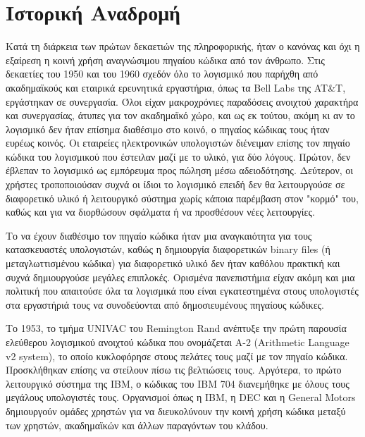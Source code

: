 \documentclass{article}
\begin{document}
{\section{Ιστορική Αναδρομή}
Κατά τη διάρκεια των πρώτων δεκαετιών της πληροφορικής, ήταν ο κανόνας και όχι η εξαίρεση η κοινή χρήση αναγνώσιμου πηγαίου κώδικα από τον άνθρωπο. Στις δεκαετίες του 1950 και του 1960 σχεδόν όλο το λογισμικό που παρήχθη από ακαδημαϊκούς και εταιρικά ερευνητικά εργαστήρια, όπως τα \textlatin{Bell Labs} της  \textlatin{AT&T}, εργάστηκαν σε συνεργασία. Όλοι είχαν μακροχρόνιες παραδόσεις ανοιχτού χαρακτήρα και συνεργασίας, άτυπες για τον ακαδημαϊκό χώρο, και ως εκ τούτου, ακόμη κι αν το λογισμικό δεν ήταν επίσημα διαθέσιμο στο κοινό, ο πηγαίος κώδικας τους ήταν ευρέως κοινός. Οι εταιρείες ηλεκτρονικών υπολογιστών διένειμαν επίσης τον πηγαίο κώδικα του λογισμικού που έστειλαν μαζί με το υλικό, για δύο λόγους. Πρώτον, δεν έβλεπαν το λογισμικό ως εμπόρευμα προς πώληση μέσω αδειοδότησης. Δεύτερον, οι χρήστες τροποποιούσαν συχνά οι ίδιοι το λογισμικό επειδή δεν θα λειτουργούσε σε διαφορετικό υλικό ή λειτουργικό σύστημα χωρίς κάποια παρέμβαση στον "κορμό" του, καθώς και για να διορθώσουν σφάλματα ή να προσθέσουν νέες λειτουργίες.

Το να έχουν διαθέσιμο τον πηγαίο κώδικα ήταν μια αναγκαιότητα για τους κατασκευαστές υπολογιστών, καθώς η δημιουργία διαφορετικών \textlatin{binary files} (ή μεταγλωττισμένου κώδικα) για διαφορετικό υλικό δεν ήταν καθόλου πρακτική και 
συχνά δημιουργούσε μεγάλες επιπλοκές. Ορισμένα πανεπιστήμια είχαν ακόμη και μια πολιτική που απαιτούσε όλα τα λογισμικά που είναι εγκατεστημένα στους υπολογιστές στα εργαστήριά τους να συνοδεύονται από δημοσιευμένους πηγαίους κώδικες.

Το 1953, το τμήμα \textlatin{UNIVAC} του \textlatin{Remington Rand} ανέπτυξε την πρώτη παρουσία ελεύθερου λογισμικού ανοιχτού κώδικα που ονομάζεται  \textlatin{A-2 (Arithmetic Language v2 system)}, το οποίο κυκλοφόρησε στους πελάτες τους μαζί με τον πηγαίο κώδικα. Προσκλήθηκαν επίσης να στείλουν πίσω τις βελτιώσεις τους. Αργότερα, το πρώτο λειτουργικό σύστημα της  \textlatin{IBM}, ο κώδικας του  \textlatin{IBM 704} διανεμήθηκε με όλους τους μεγάλους υπολογιστές τους. Οργανισμοί όπως η \textlatin{IBM}, η \textlatin{DEC} και η \textlatin{General Motors} δημιουργούν ομάδες χρηστών για να διευκολύνουν την κοινή χρήση κώδικα μεταξύ των χρηστών, ακαδημαϊκών και άλλων
παραγόντων του κλάδου. 

}
\end{document}
